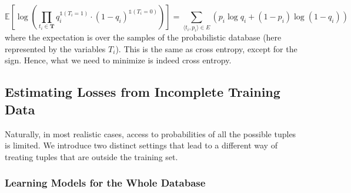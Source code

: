 \documentclass[akbc,twoside,11pt]{article}
\newcounter{example}
\newcommand{\ondrej}[1]{\textcolor{red}{O: {#1}}}
\newcommand{\guy}[1]{\textcolor{red}{G: {#1}}}
\begin{document}
\begin{equation}\label{cross_entropy}
    \mathbb{E}\left[ \log{\left( \prod_{ t_i \in \mathbf{T}} q_i^{\mathds{1}(T_i = 1)} \cdot (1-q_i)^{\mathds{1}(T_i = 0)} \right)} \right]
    = \sum_{\langle t_i, p_i \rangle \in E} \left( p_i \log{ q_i} + (1-p_i) \log{\left( 1-q_i \right)} \right)
\end{equation}
where the expectation is over the samples of the probabilistic database (here represented by the variables $T_i$).
This is the same as cross entropy, except for the sign. Hence, what we need to minimize is indeed cross entropy.


\subsection{Estimating Losses from Incomplete Training Data}

Naturally, in most realistic cases, access to probabilities of all the possible tuples is limited. We introduce two distinct settings that lead to a different way of treating tuples that are outside the training set.  %

\subsubsection{Learning Models for the Whole Database}\label{sub:samp}
\end{document}
